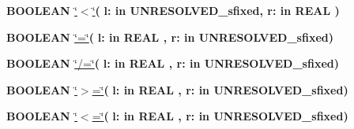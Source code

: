 \begin{DoxyCompactItemize}
\item 
{\bfseries {\bfseries \textcolor{comment}{B\+O\+O\+L\+E\+A\+N}\textcolor{vhdlchar}{ }}} \hyperlink{classfixed__pkg_a5d059cf3277e3585e4f3f076db10b273}{\char`\"{}$<$\char`\"{}}{\bfseries  ( }{\bfseries \textcolor{vhdlchar}{l\+: }\textcolor{stringliteral}{in }\textcolor{vhdlchar}{U\+N\+R\+E\+S\+O\+L\+V\+E\+D\+\_\+sfixed}}{\bfseries  , \textcolor{vhdlchar}{r\+: }\textcolor{stringliteral}{in }{\bfseries \textcolor{comment}{R\+E\+A\+L}\textcolor{vhdlchar}{ }}}{\bfseries  )} 
\item 
{\bfseries {\bfseries \textcolor{comment}{B\+O\+O\+L\+E\+A\+N}\textcolor{vhdlchar}{ }}} \hyperlink{classfixed__pkg_a7949e9258ea0749e3b35961feea8db87}{\char`\"{}=\char`\"{}}{\bfseries  ( }{\bfseries \textcolor{vhdlchar}{l\+: }\textcolor{stringliteral}{in }{\bfseries \textcolor{comment}{R\+E\+A\+L}\textcolor{vhdlchar}{ }}}{\bfseries  , \textcolor{vhdlchar}{r\+: }\textcolor{stringliteral}{in }\textcolor{vhdlchar}{U\+N\+R\+E\+S\+O\+L\+V\+E\+D\+\_\+sfixed}}{\bfseries  )} 
\item 
{\bfseries {\bfseries \textcolor{comment}{B\+O\+O\+L\+E\+A\+N}\textcolor{vhdlchar}{ }}} \hyperlink{classfixed__pkg_a00087aded97b434060226b9ba63a9077}{\char`\"{}/=\char`\"{}}{\bfseries  ( }{\bfseries \textcolor{vhdlchar}{l\+: }\textcolor{stringliteral}{in }{\bfseries \textcolor{comment}{R\+E\+A\+L}\textcolor{vhdlchar}{ }}}{\bfseries  , \textcolor{vhdlchar}{r\+: }\textcolor{stringliteral}{in }\textcolor{vhdlchar}{U\+N\+R\+E\+S\+O\+L\+V\+E\+D\+\_\+sfixed}}{\bfseries  )} 
\item 
{\bfseries {\bfseries \textcolor{comment}{B\+O\+O\+L\+E\+A\+N}\textcolor{vhdlchar}{ }}} \hyperlink{classfixed__pkg_a4cd07e388cdbb3996dd11f56781d3758}{\char`\"{}$>$=\char`\"{}}{\bfseries  ( }{\bfseries \textcolor{vhdlchar}{l\+: }\textcolor{stringliteral}{in }{\bfseries \textcolor{comment}{R\+E\+A\+L}\textcolor{vhdlchar}{ }}}{\bfseries  , \textcolor{vhdlchar}{r\+: }\textcolor{stringliteral}{in }\textcolor{vhdlchar}{U\+N\+R\+E\+S\+O\+L\+V\+E\+D\+\_\+sfixed}}{\bfseries  )} 
\item 
{\bfseries {\bfseries \textcolor{comment}{B\+O\+O\+L\+E\+A\+N}\textcolor{vhdlchar}{ }}} \hyperlink{classfixed__pkg_a65b73a94d4fe541a941f431175b342b7}{\char`\"{}$<$=\char`\"{}}{\bfseries  ( }{\bfseries \textcolor{vhdlchar}{l\+: }\textcolor{stringliteral}{in }{\bfseries \textcolor{comment}{R\+E\+A\+L}\textcolor{vhdlchar}{ }}}{\bfseries  , \textcolor{vhdlchar}{r\+: }\textcolor{stringliteral}{in }\textcolor{vhdlchar}{U\+N\+R\+E\+S\+O\+L\+V\+E\+D\+\_\+sfixed}}{\bfseries  )} 

\end{DoxyCompactItemize}
